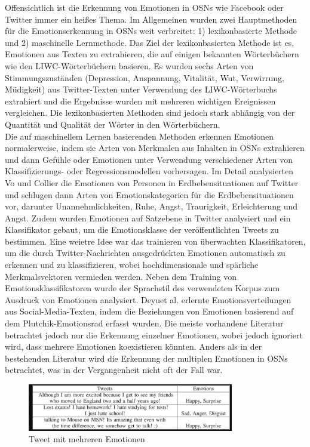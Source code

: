 \documentclass[conference]{IEEEtran}
\begin{document}
Offensichtlich ist die Erkennung von Emotionen in OSNs wie Facebook oder Twitter immer ein heißes Thema. Im Allgemeinen wurden zwei Hauptmethoden für die Emotionserkennung in OSNs weit verbreitet: 1) lexikonbasierte Methode und 2) maschinelle Lernmethode. Das Ziel der lexikonbasierten Methode ist es, Emotionen aus Texten zu extrahieren, die auf einigen bekannten
Wörterbüchern wie den LIWC-Wörterbüchern basieren. Es wurden sechs Arten von Stimmungszuständen (Depression, Anspannung, Vitalität, Wut, Verwirrung, Müdigkeit) aus Twitter-Texten unter Verwendung des LIWC-Wörterbuchs extrahiert und die Ergebnisse wurden mit mehreren wichtigen Ereignissen vergleichen. Die lexikonbasierten Methoden sind jedoch stark abhängig von der Quantität und Qualität der Wörter in den Wörterbüchern.
\\ 
Die auf maschinellem Lernen basierenden Methoden erkennen Emotionen normalerweise, indem sie Arten von Merkmalen aus Inhalten in OSNs extrahieren und dann Gefühle oder Emotionen unter Verwendung verschiedener Arten von Klassifizierungs- oder Regressionsmodellen vorhersagen. Im Detail analysierten Vo und Collier die Emotionen von Personen in Erdbebensituationen auf Twitter und schlugen dann Arten von Emotionskategorien für die Erdbebensituationen vor, darunter Unannehmlichkeiten, Ruhe, Angst, Traurigkeit, Erleichterung und Angst. Zudem wurden Emotionen auf Satzebene in Twitter analysiert und ein Klassifikator gebaut, um die Emotionsklasse der veröffentlichten Tweets zu bestimmen. Eine weietre Idee war das trainieren von überwachten Klassifikatoren, um die durch Twitter-Nachrichten ausgedrückten Emotionen automatisch zu erkennen und zu klassifizieren, wobei hochdimensionale und spärliche Merkmalsvektoren vermieden werden. Neben dem Training von Emotionsklassifikatoren wurde der Sprachstil des verwendeten Korpus zum Ausdruck von Emotionen analysiert. Deyuet al. erlernte Emotionsverteilungen aus Social-Media-Texten, indem die Beziehungen von Emotionen basierend auf dem Plutchik-Emotionsrad erfasst wurden. Die meiste vorhandene Literatur betrachtet jedoch nur die Erkennung einzelner Emotionen, wobei jedoch ignoriert wird, dass mehrere
Emotionen koexistieren könnten. Anders als in der bestehenden Literatur wird  die Erkennung der multiplen Emotionen in OSNs betrachtet, was in der Vergangenheit nicht oft der Fall war.\cite{b1}
\begin{figure}[h]
	\centering
	\includegraphics[width=9cm]{Tweets}
	\caption{Tweet mit mehreren Emotionen}
\end{figure}
\end{document}
